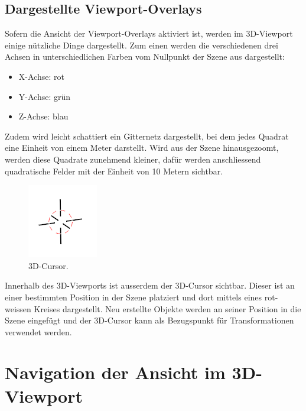 \documentclass[
]{book}
\providecommand{\tightlist}{%
  \setlength{\itemsep}{0pt}\setlength{\parskip}{0pt}}\usepackage{longtable,booktabs,array}
\let\oldmarginnote\marginnote
\renewcommand{\marginnote}[1]{%
  \oldmarginnote{{\footnotesize\selectfont #1}}%
}
\begin{document}
\section{Dargestellte
Viewport-Overlays}\label{dargestellte-viewport-overlays}

\marginnote{Achsen}

Sofern die Ansicht der Viewport-Overlays aktiviert ist, werden im
3D-Viewport einige nützliche Dinge dargestellt. Zum einen werden die
verschiedenen drei Achsen in unterschiedlichen Farben vom Nullpunkt der
Szene aus dargestellt:

\begin{itemize}
\tightlist
\item
  X-Achse: rot
\item
  Y-Achse: grün
\item
  Z-Achse: blau
\end{itemize}

Zudem wird leicht schattiert ein Gitternetz dargestellt, bei dem jedes
Quadrat eine Einheit von einem Meter darstellt. Wird aus der Szene
hinausgezoomt, werden diese Quadrate zunehmend kleiner, dafür werden
anschliessend quadratische Felder mit der Einheit von 10 Metern
sichtbar.

\begin{figure}

\includegraphics{Chapters/Images/Chapter_2/2_9_3DCursor.png}

\caption{\label{fig-2_9}3D-Cursor.}

\end{figure}%

\marginnote{3D-Cursor}

Innerhalb des 3D-Viewports ist ausserdem der 3D-Cursor sichtbar. Dieser
ist an einer bestimmten Position in der Szene platziert und dort mittels
eines rot-weissen Kreises dargestellt. Neu erstellte Objekte werden an
seiner Position in die Szene eingefügt und der 3D-Cursor kann als
Bezugspunkt für Transformationen verwendet werden.

\chapter{Navigation der Ansicht im
3D-Viewport}\label{navigation-der-ansicht-im-3d-viewport}
\end{document}
